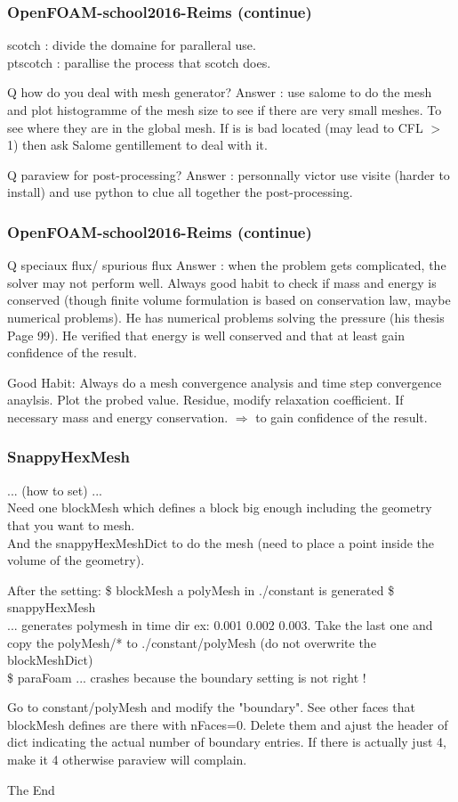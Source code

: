 \documentclass{beamer}
\begin{document}
\begin{frame}
\frametitle{OpenFOAM-school2016-Reims (continue)}
scotch : divide the domaine for paralleral use. \\
ptscotch : parallise the process that scotch does.

Q how do you deal with mesh generator?
Answer : use salome to do the mesh and plot histogramme of the mesh size to see if there are very small meshes. To see where they are in the global mesh. If is is bad located (may lead to CFL $>$ 1) then ask Salome gentillement to deal with it.

Q paraview for post-processing?
Answer : personnally victor use visite (harder to install) and use python to clue all together the post-processing.
\end{frame}

\begin{frame}
\frametitle{OpenFOAM-school2016-Reims (continue)}
Q speciaux flux/ spurious flux
Answer : when the problem gets complicated, the solver may not perform well. Always good habit to check if mass and energy is conserved (though finite volume formulation is based on conservation law, maybe numerical problems). He has numerical problems solving the pressure (his thesis Page 99). He verified that energy is well conserved and that at least gain confidence of the result.

Good Habit:
Always do a mesh convergence analysis and time step convergence anaylsis. Plot the probed value. Residue, modify relaxation coefficient.
If necessary mass and energy conservation.
$\Rightarrow$ to gain confidence of the result.
\end{frame}

\begin{frame}
\frametitle{SnappyHexMesh}
... (how to set) ... \\
Need one blockMesh which defines a block big enough including the geometry that you want to mesh.\\
And the snappyHexMeshDict to do the mesh (need to place a point inside the volume of the geometry).

After the setting:
\$ blockMesh
a polyMesh in ./constant is generated 
\$ snappyHexMesh \\
...
generates polymesh in time dir ex: 0.001 0.002 0.003.
Take the last one and copy the polyMesh/* to ./constant/polyMesh (do not overwrite the blockMeshDict)\\

\$ paraFoam ... crashes because the boundary setting is not right !

Go to constant/polyMesh and modify the "boundary". See other faces that blockMesh defines are there with nFaces=0. Delete them and ajust the header of dict indicating the actual number of boundary entries. If there is actually just 4, make it 4 otherwise paraview will complain.

\end{frame}


\begin{frame}
\Huge{\centerline{The End}}
\end{frame}

\end{document}
